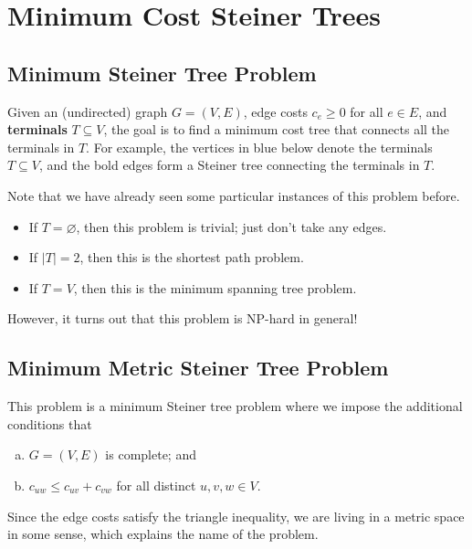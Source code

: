 \section{Minimum Cost Steiner Trees} \label{sec:5}

\subsection{Minimum Steiner Tree Problem}
Given an (undirected) graph $G = (V, E)$, edge costs $c_e \geq 0$ for all 
$e \in E$, and {\bf terminals} $T \subseteq V$, the goal is to find a 
minimum cost tree that connects all the terminals in $T$. For example, 
the vertices in blue below denote the terminals $T \subseteq V$, 
and the bold edges form a Steiner tree connecting the terminals in $T$. 
\begin{center}
\end{center}
\vspace{-0.25cm}
Note that we have already seen some particular instances of this problem before.
\begin{itemize}
    \item If $T = \varnothing$, then this problem is trivial; just don't take any edges.
    \item If $|T| = 2$, then this is the shortest path problem.
    \item If $T = V$, then this is the minimum spanning tree problem.
\end{itemize}
However, it turns out that this problem is NP-hard in general!

\subsection{Minimum Metric Steiner Tree Problem} \label{subsec:5.2}
This problem is a minimum Steiner tree problem where we impose the additional 
conditions that
\begin{enumerate}[(a)]
    \item $G = (V, E)$ is complete; and 
    \item $c_{uw} \leq c_{uv} + c_{vw}$ for all distinct $u, v, w \in V$.
\end{enumerate}
Since the edge costs satisfy the triangle inequality, we are living 
in a metric space in some sense, which explains the name of the problem.

